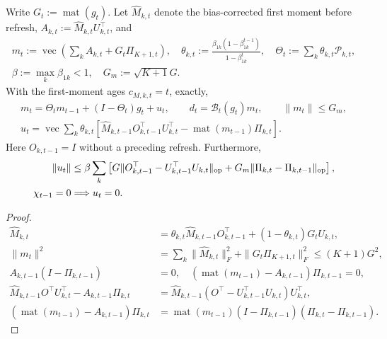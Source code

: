 \begin{proposition}\label{prop:actual-momentum}
Write $G_t:=\operatorname{mat}(g_t)$. Let $\widehat M_{k,t}$ denote the bias-corrected first moment before refresh,
$A_{k,t}:=\widehat M_{k,t}U_{k,t}^\top$, and
\begin{gather}
 m_t:=\operatorname{vec}\left(\sum_k A_{k,t}+G_t\Pi_{K+1,t}\right),\quad
 \theta_{k,t}:=\frac{\beta_{1k}(1-\beta_{1k}^{t-1})}{1-\beta_{1k}^t},\quad
 \Theta_t:=\sum_k\theta_{k,t}\mathcal P_{k,t},\\
 \beta:=\max_k\beta_{1k}<1,\quad G_m:=\sqrt{K+1}G.
\end{gather}
With the first-moment ages $c_{M,k,t}=t$, exactly,
\begin{gather}
 m_t=\Theta_tm_{t-1}+(I-\Theta_t)g_t+u_t,\qquad
 d_t=\mathcal B_t(g_t)m_t,\qquad \|m_t\|\le G_m,\\
 u_t=\operatorname{vec}\sum_k\theta_{k,t}
 \left[\widehat M_{k,t-1}O_{k,t-1}^\top U_{k,t}^\top
                          -\operatorname{mat}(m_{t-1})\Pi_{k,t}\right].
\end{gather}
Here $O_{k,t-1}=I$ without a preceding refresh. Furthermore,
\begin{align}
 \|u_t\|
 &\le\beta\sum_k\left[
 G\|O_{k,t-1}^\top-U_{k,t-1}^\top U_{k,t}\|_{\mathrm{op}}
 +G_m\|\Pi_{k,t}-\Pi_{k,t-1}\|_{\mathrm{op}}\right],\\
 \chi_{t-1}=0&\Longrightarrow u_t=0.
\end{align}
\end{proposition}
\begin{proof}
\begin{align}
 \widehat M_{k,t}
 &=\theta_{k,t}\widehat M_{k,t-1}O_{k,t-1}^\top
                         +(1-\theta_{k,t})G_tU_{k,t},\\
 \|m_t\|^2&=\sum_k\|\widehat M_{k,t}\|_F^2+\|G_t\Pi_{K+1,t}\|_F^2
 \le(K+1)G^2,\\
 A_{k,t-1}(I-\Pi_{k,t-1})&=0,\quad
 (\operatorname{mat}(m_{t-1})-A_{k,t-1})\Pi_{k,t-1}=0,\\
 \widehat M_{k,t-1}O^\top U_{k,t}^\top-A_{k,t-1}\Pi_{k,t}
 &=\widehat M_{k,t-1}(O^\top-U_{k,t-1}^\top U_{k,t})U_{k,t}^\top,\\
 (\operatorname{mat}(m_{t-1})-A_{k,t-1})\Pi_{k,t}
 &=\operatorname{mat}(m_{t-1})(I-\Pi_{k,t-1})
                                     (\Pi_{k,t}-\Pi_{k,t-1}).
\end{align}
\end{proof}

